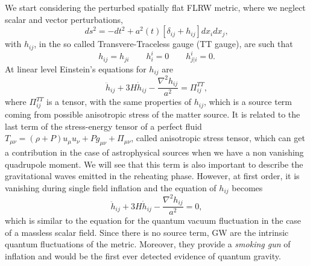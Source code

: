 \documentclass[11pt,a4paper,twoside]{book}
\begin{document}
We start considering the perturbed spatially flat FLRW metric, where we neglect scalar and vector perturbations,
\begin{equation}
	ds^{2} = -dt^{2} + a^{2}(t)[\delta_{ij} + h_{ij}]dx_{i}dx_{j},
\end{equation}
with $ h_{ij} $, in the so called Transvere-Traceless gauge (TT gauge), are such that
\begin{equation}
	h_{ij}=h_{ji} \qquad h^{i}_{i}=0 \qquad h^{i}_{j|i} = 0.
\end{equation}
 At linear level Einstein's equations for $ h_{ij} $ are 
 \begin{equation}
 	\ddot{h}_{ij} + 3H\dot{h}_{ij} - \frac{\nabla^{2}h_{ij}}{a^{2}}= \Pi^{TT}_{ij},
 \end{equation}
where $\Pi^{TT}_{ij}$ is a tensor, with the same properties of $ h_{ij} $, which is a source term coming from possible anisotropic stress of the matter source. It is related  to the last term of the stress-energy tensor of a perfect fluid $ T_{\mu\nu} = (\rho + P)u_{\mu}u_{\nu} + Pg_{\mu\nu} + \Pi_{\mu\nu}$, called anisotropic stress tensor, which can get a contribution in the case of astrophysical sources when we have a non vanishing quadrupole moment. We will see that this term is also important to describe the gravitational waves emitted in the reheating phase.
However, at first order, it is vanishing during single field inflation and the equation of $ h_{ij} $ becomes 
\begin{equation}
	\label{eqh}
		\ddot{h}_{ij} + 3H\dot{h}_{ij} - \frac{\nabla^{2}h_{ij}}{a^{2}}=0,
\end{equation}
which is similar to the equation for the quantum vacuum fluctuation in the case of a massless scalar field.
Since there is no source term, GW are the intrinsic quantum fluctuations of the metric. Moreover, they provide a \textit{smoking gun} of inflation and would be the first ever detected evidence of quantum gravity.
\end{document}
